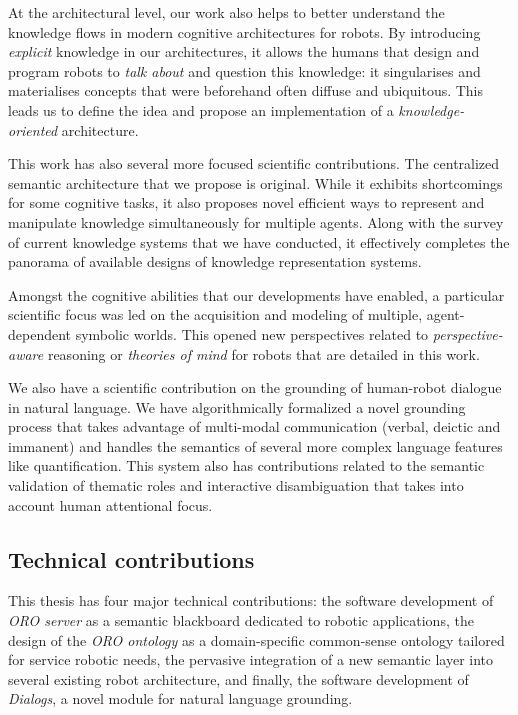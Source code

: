 At the architectural level, our work also helps to better understand the
knowledge flows in modern cognitive architectures for robots. By introducing
\emph{explicit} knowledge in our architectures, it allows the humans that
design and program robots to \emph{talk about} and question this knowledge: it
singularises and materialises concepts that were beforehand often
diffuse and ubiquitous. This leads us to define the idea and propose an
implementation of a \emph{knowledge-oriented} architecture.

This work has also several more focused scientific contributions. The
centralized semantic architecture that we propose is original. While it
exhibits shortcomings for some cognitive tasks, it also proposes novel efficient
ways to represent and manipulate knowledge simultaneously for multiple agents.
Along with the survey of current knowledge systems that we have conducted,
it effectively completes the panorama of available designs of knowledge
representation systems.

Amongst the cognitive abilities that our developments have enabled, a
particular scientific focus was led on the acquisition and modeling of
multiple, agent-dependent symbolic worlds. This opened new perspectives related
to \emph{perspective-aware} reasoning or \emph{theories of mind} for robots
that are detailed in this work.

We also have a scientific contribution on the grounding of human-robot
dialogue in natural language. We have algorithmically formalized a novel
grounding process that takes advantage of multi-modal communication (verbal,
deictic and immanent) and handles the semantics of several more complex
language features like quantification. This system also has contributions
related to the semantic validation of thematic roles and interactive
disambiguation that takes into account human attentional focus.

\subsection{Technical contributions}
\label{sect|technical-contributions}


This thesis has four major technical contributions: the software development of
\emph{ORO server} as a semantic blackboard dedicated to robotic applications,
the design of the \emph{ORO ontology} as a domain-specific common-sense
ontology tailored for service robotic needs, the pervasive integration of a new
semantic layer into several existing robot architecture, and finally, the
software development of \emph{Dialogs}, a novel module for natural language
grounding.

